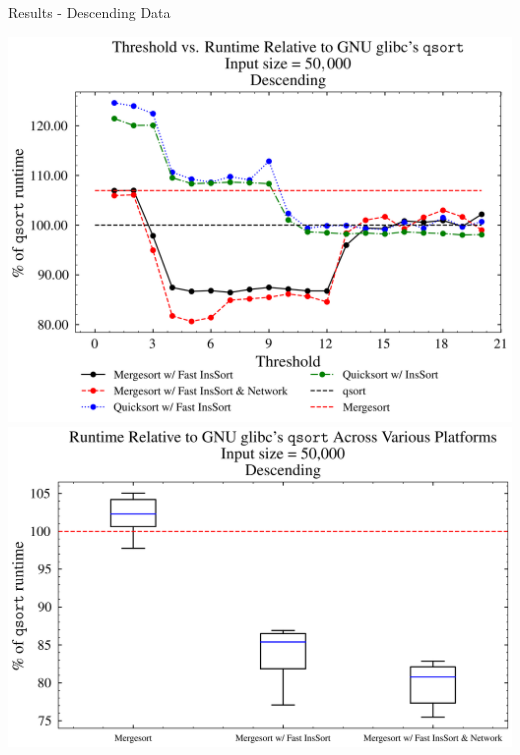 \documentclass[13pt]{beamer}
\begin{document}
\begin{frame}{Results - Descending Data}
	\begin{multicols}{2}
		\includegraphics[width=\columnwidth]{../figures/descending.png}
		\includegraphics[width=\columnwidth]{../figures/boxplots/3.gen.png}
	\end{multicols}
\end{frame}
\end{document}
